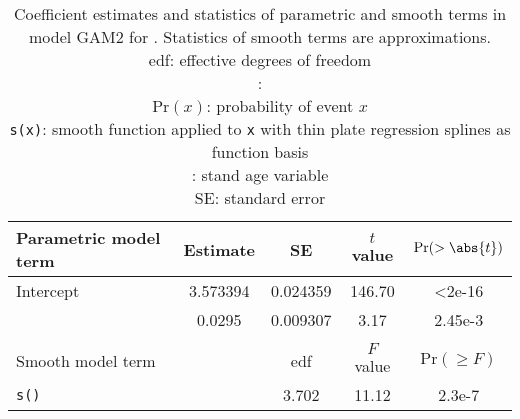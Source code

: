 \begin{singlespace}
  \begin{table}[h]
    \caption{Coefficient estimates and statistics of parametric and smooth terms in model GAM2 for \Beech{}.  Statistics of smooth terms are approximations. \\
      edf: effective degrees of freedom \\
      \texttt{\ProductivityIndexVariableR{}}: \ProductivityIndexVariableText{} \\
      \(\text{Pr}(x)\): probability of event \(x\) \\
      \texttt{s(x)}: smooth function applied to \texttt{x} with thin plate regression splines as function basis \\
      \texttt{\StandAgeVariableR{}}: stand age variable \\
      SE: standard error}
    \label{tab:StatisticsGAM2Beech}
    {\tabulinesep=2mm
      \begin{tabu}{L
          S[table-format = 1.6]
          S[table-format = 1.6]
          S[table-format = 3.2]
          S[table-format = 1.2e-2, table-comparator = true]
        }
        \toprule
        Parametric model term & {Estimate} & {SE} & {\(t\) value} & {\(\text{Pr}(> \abs{t})\)} \\
        \midrule
        Intercept & 3.573394 & 0.024359 & 146.70 & <2e-16 \\
        \texttt{\ProductivityIndexVariableR{}} & 0.0295 & 0.009307 & 3.17 & 2.45e-3 \\
        \\
        Smooth model term &  & {edf} & {\(F\) value} & {\(\text{Pr}(\geq F)\)} \\
        \midrule
        \texttt{s(\StandAgeVariableR{})} & & 3.702 & 11.12 & 2.3e-7 \\
        \bottomrule
      \end{tabu}
    }
  \end{table}
\end{singlespace}

